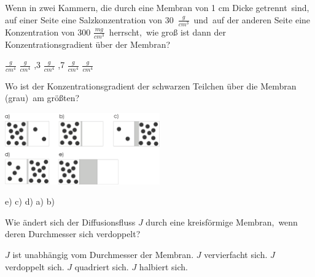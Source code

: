 \documentclass[11pt]{exam}
\begin{document}
\setlength{\voffset}{-0.5in}
\setlength{\headsep}{5pt}

\hspace{2mm}
 \hspace{5mm}
\vspace{4mm}

\begin{questions}

\question Wenn in zwei Kammern, die durch eine Membran von 1 cm Dicke getrennt sind, auf einer Seite eine Salzkonzentration von 30 \( \frac{g}{cm^3} \) und auf der anderen Seite eine Konzentration von 300 \( \frac{mg}{cm^3} \) herrscht, wie groß ist dann der Konzentrationsgradient über der Membran?

\begin{choices}
	 \( \frac{g}{cm^4} \)
	 \( \frac{g}{cm^4} \)
	,3 \( \frac{g}{cm^4} \)
	,7 \( \frac{g}{cm^4} \)
	 \( \frac{g}{cm^4} \)
\end{choices}

\vspace{3mm}\question Wo ist der Konzentrationsgradient der schwarzen Teilchen über die Membran (grau) am größten? 

\includegraphics[width=0.5\textwidth]{../../../questions/E/images/Diffusion.png}

\begin{choices}
	\choice e)
	\choice c)
	\choice d)
	\choice a)
	\choice b)
\end{choices}

\vspace{3mm}\question Wie ändert sich der Diffusionsfluss \( J \) durch eine kreisförmige Membran, wenn deren Durchmesser sich verdoppelt?

\begin{choices}
	\choice \( J \) ist unabhängig vom Durchmesser der Membran.
	\choice \( J \) vervierfacht sich.
	\choice \( J \) verdoppelt sich.
	\choice \( J \) quadriert sich.
	\choice \( J \) halbiert sich.
\end{choices}


\end{questions}
\end{document}
